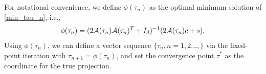 \documentclass{article}
\newtheorem{theorem}{Theorem}[section]
\theoremstyle{remark}
\begin{document}
For notational convenience, we define $\phi(\tau_{n})$ as the optimal minimum solution of \eqref{min_tau_n}, i.e.,
\[
\phi(\tau_{n})=( 2{\cal A}(\tau_{n}){\cal A}(\tau_{n})^T+ I_d)^{-1} (2{\cal A}(\tau_{n})c+ s).
\]
Using $\phi(\tau_n)$, we can define a vector sequence $\{\tau_n, n = 1,2...,\}$ via the fixed-point iteration with
$\tau_{n+1} = \phi(\tau_n)$, and set the convergence point $\tau^*$ as the coordinate for the true projection.
\end{document}
